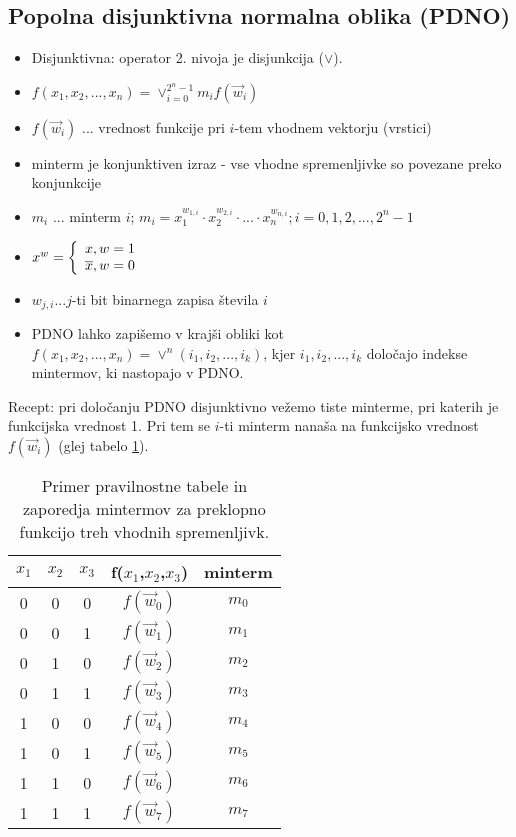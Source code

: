 \subsection{Popolna disjunktivna normalna oblika (PDNO)}
\begin{itemize}
\item Disjunktivna: operator 2. nivoja je disjunkcija ($\vee$).
\item $f(x_1,x_2,...,x_n)=\vee_{i=0}^{2^{n}-1}m_i f(\vec{w}_i)$
\item $f(\vec{w}_i)$ ... vrednost funkcije pri $i$-tem vhodnem vektorju (vrstici)
\item minterm je konjunktiven izraz - vse vhodne spremenljivke so povezane preko konjunkcije
\item $m_i$ ... minterm $i$; $m_i = x_1^{w_{1,i}} \cdot x_2^{w_{2,i}} \cdot ... \cdot x_n^{w_{n,i}}; i=0,1,2,...,2^n-1$
\item $x^w = \left\{\begin{array}{clcr}
 x, w=1 \\ \overline x, w=0 \end{array} \right.$
\item $w_{j,i}$...$j$-ti bit binarnega zapisa števila $i$
\item PDNO lahko zapišemo v krajši obliki kot $f(x_1,x_2,...,x_n)=\vee^n(i_1,i_2,...,i_k)$, kjer $i_1,i_2,...,i_k$ določajo indekse mintermov, ki nastopajo v PDNO.
\end{itemize}

Recept: pri določanju PDNO disjunktivno vežemo tiste minterme, pri katerih je funkcijska vrednost 1. Pri tem se $i$-ti minterm nanaša na funkcijsko vrednost $f(\vec{w}_i)$ (glej tabelo \ref{tab:mintermi}).

\begin{table}[ht]
\centering
\begin{tabular}{ccc|c|c}
$x_1$ & $x_2$ & $x_3$ & f($x_1$,$x_2$,$x_3$) & minterm\\
\hline
0 & 0 & 0 & $f(\vec{w}_0)$ & $m_0$ \\
0 & 0 & 1 & $f(\vec{w}_1)$ & $m_1$ \\
0 & 1 & 0 & $f(\vec{w}_2)$ & $m_2$ \\
0 & 1 & 1 & $f(\vec{w}_3)$ & $m_3$ \\
1 & 0 & 0 & $f(\vec{w}_4)$ & $m_4$ \\
1 & 0 & 1 & $f(\vec{w}_5)$ & $m_5$ \\
1 & 1 & 0 & $f(\vec{w}_6)$ & $m_6$ \\
1 & 1 & 1 & $f(\vec{w}_7)$ & $m_7$ 
\end{tabular}
\caption{Primer pravilnostne tabele in zaporedja mintermov za preklopno funkcijo treh vhodnih spremenljivk.}
\label{tab:mintermi}
\end{table}


